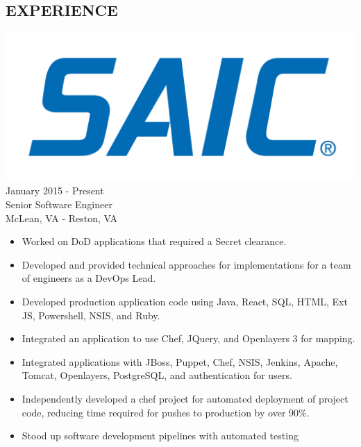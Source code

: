 \documentclass[12pt, line, margin]{res}
\begin{document}
\begin{resume}
\section{ EXPERIENCE} {\sl  \includegraphics[scale=0.015, trim=110 200 110 120]{resume_images/SAIC_logo_RGB-lg.jpg}} \hfill January 2015 - Present \\
                Senior Software Engineer \\
                McLean, VA - Reston, VA
                 \begin{itemize}  \itemsep -2pt %
                \item   Worked on DoD applications that required a Secret clearance.
	      \item   Developed and provided technical approaches for \newline
                                implementations for a team of engineers as a DevOps Lead.
	      \item   Developed production application code using Java, React, SQL, \newline
                                HTML, Ext JS, Powershell, NSIS, and Ruby.
	      \item   Integrated an application to use Chef, JQuery, and 
                                Openlayers 3 for mapping.
	      \item   Integrated applications with JBoss, Puppet, Chef, NSIS, Jenkins,
                               Apache, Tomcat, Openlayers, PostgreSQL, and authentication for users.
	      \item   Independently developed a chef project for automated \newline 
                                deployment of project code, reducing time required for\newline
                                pushes to production by over 90\%.
	      \item   Stood up software development pipelines with automated testing \newline

\end{itemize}
\end{resume}
\end{document}
